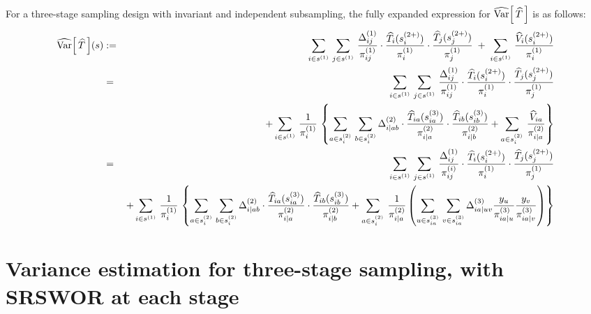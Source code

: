 \begin{corollary}\label{corollary:threeStage}\mbox{}\vskip 0.1cm
\noindent
For a three-stage sampling design with invariant and independent subsampling,
the fully expanded expression for $\widehat{\textnormal{Var}}\!\left[\,\widehat{T}\,\right]$ is as follows:
\begin{eqnarray*}
\widehat{\textnormal{Var}}\!\left[\,\widehat{T}\,\right]\!(s)
&:=&
\sum_{i\in s^{(1)}}\,\sum_{j\in s^{(1)}}\,
\dfrac{\Delta^{(1)}_{ij}}{\pi^{(1)}_{ij}}
\cdot
\dfrac{\widehat{T}_{i}(s^{(2+)}_{i})}{\pi^{(1)}_{i}}
\cdot
\dfrac{\widehat{T}_{j}(s^{(2+)}_{j})}{\pi^{(1)}_{j}}
\;+\;
\sum_{i\in s^{(1)}}\,\dfrac{\widehat{V}_{i}(s^{(2+)}_{i})}{\pi^{(1)}_{i}}
\\
&=&
\sum_{i\in s^{(1)}}\,\sum_{j\in s^{(1)}}\,
\dfrac{\Delta^{(1)}_{ij}}{\pi^{(1)}_{ij}}
\cdot
\dfrac{\widehat{T}_{i}(s^{(2+)}_{i})}{\pi^{(1)}_{i}}
\cdot
\dfrac{\widehat{T}_{j}(s^{(2+)}_{j})}{\pi^{(1)}_{j}}
\\&&
+
\sum_{i\in s^{(1)}}\,\dfrac{1}{\pi^{(1)}_{i}}\,\left\{
\sum_{a\in s^{(2)}_{i}}\,\sum_{b\in s^{(2)}_{i}}
\Delta^{(2)}_{i \vert ab}\cdot\dfrac{\widehat{T}_{ia}(s^{(3)}_{ia})}{\pi^{(2)}_{i \vert a}}\cdot\dfrac{\widehat{T}_{ib}(s^{(3)}_{ib})}{\pi^{(2)}_{i \vert b}}
+
\sum_{a \in s^{^{(2)}}_{i}}\,\dfrac{\widehat{V}_{ia}}{\pi^{(2)}_{i \vert a}}
\right\}
\\
&=&
\sum_{i\in s^{(1)}}\,\sum_{j\in s^{(1)}}\,
\dfrac{\Delta^{(1)}_{ij}}{\pi^{(i)}_{ij}}
\cdot
\dfrac{\widehat{T}_{i}(s^{(2+)}_{i})}{\pi^{(1)}_{i}}
\cdot
\dfrac{\widehat{T}_{j}(s^{(2+)}_{j})}{\pi^{(1)}_{j}}
\\&&
+
\sum_{i\in s^{(1)}}\,\dfrac{1}{\pi^{(1)}_{i}}\,\left\{
\sum_{a\in s^{(2)}_{i}}\,\sum_{b\in s^{(2)}_{i}}
\Delta^{(2)}_{i \vert ab}\cdot\dfrac{\widehat{T}_{ia}(s^{(3)}_{ia})}{\pi^{(2)}_{i \vert a}}\cdot\dfrac{\widehat{T}_{ib}(s^{(3)}_{ib})}{\pi^{(2)}_{i \vert b}}
+
\sum_{a \in s^{^{(2)}}_{i}}\,\dfrac{1}{\pi^{(2)}_{i \vert a}}
\left(\sum_{u \in s^{(3)}_{ia}}\,\sum_{v \in s^{(3)}_{ia}}\Delta^{(3)}_{ia\vert uv}\dfrac{y_{u}}{\pi^{(3)}_{ia\vert u}}\dfrac{y_{v}}{\pi^{(3)}_{ia\vert v}}\right)
\right\}
\end{eqnarray*}
\end{corollary}


\clearpage
\section{Variance estimation for three-stage sampling, with SRSWOR at each stage}
\setcounter{theorem}{0}
\setcounter{equation}{0}

